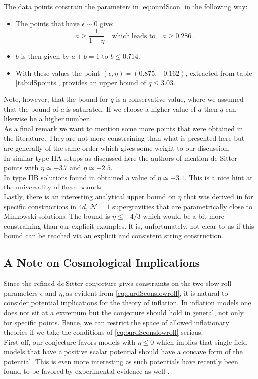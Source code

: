 \documentclass[12pt]{report}
\newcommand{\be}{\begin{equation}}
\newcommand{\ee}{\end{equation}}
\begin{document}
The data points constrain the parameters in \eqref{eq:ourdScon} in the following way:
\begin{itemize}
     \item The points that have $\epsilon \sim 0$ give:
     \be 
     a \geq \frac{1}{1-\eta} \quad \text{which leads to} \quad a\geq 0.286\,.
     \ee
     \item $b$ is then given by $a+b = 1$ to $b \leq 0.714$.
     \item With these values the point $(\epsilon,\eta) = (0.875,-0.162)$, extracted from table \ref{tab:dSpoints}, provides an upper bound of $q \leq 3.03$.
\end{itemize}
Note, however, that the bound for $q$ is a conservative value, where we assumed that the bound of $a$ is saturated. If we choose a higher value of $a$ then $q$ can likewise be a higher number.\\
As a final remark we want to mention some more points that were obtained in the literature. They are not more constraining than what is presented here but are generally of the same order which gives some weight to our discussion.\\
In similar type IIA setups as discussed here the authors of \cite{Flauger:2008ad} mention de Sitter points with $\eta \simeq -3.7$ and $\eta \simeq -2.5$.\\
In type IIB solutions found in \cite{Caviezel:2009tu} obtained a value of $\eta \simeq -3.1$. This is a nice hint at the universality of these bounds. \\
Lastly, there is an interesting analytical upper bound on $\eta$ that was derived in \cite{Junghans:2016abx} for specific constructions in $4d$, $\mathcal{N}=1$ supergravities that are parametrically close to Minkowski solutions. The bound is $\eta \leq -4/3$ which would be a bit more constraining than our explicit examples. It is, unfortunately, not clear to us if this bound can be reached via an explicit and consistent string construction.

\subsection{A Note on Cosmological Implications}
Since the refined de Sitter conjecture gives constraints on the two slow-roll parameters $\epsilon$ and $\eta$, as evident from \eqref{eq:ourdSconslowroll}, it is natural to consider potential implications for the theory of inflation. In inflation models one does not sit at a extremum but the conjecture should hold in general, not only for specific points. Hence, we can restrict the space of allowed inflationary theories if we take the conditions of \eqref{eq:ourdSconslowroll} serious.\\
First off, our conjecture favors models with $\eta \leq 0$ which implies that single field models that have a positive scalar potential should have a concave form of the potential. This is even more interesting as such potentials have recently been found to be favored by experimental evidence as well \cite{Planck:2018jri}.
\end{document}
